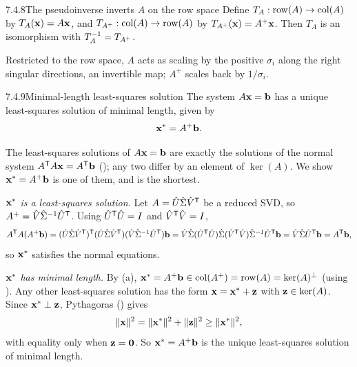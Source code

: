 \begin{thms}{7.4.8}{The pseudoinverse inverts $A$ on the row space}
Define $T_A:\operatorname{row}(A)\to\operatorname{col}(A)$ by $T_A(\mathbf{x})=A\mathbf{x}$, and $T_{A^+}:\operatorname{col}(A)\to\operatorname{row}(A)$ by $T_{A^+}(\mathbf{x})=A^+\mathbf{x}$. Then $T_A$ is an isomorphism with $T_A^{-1}=T_{A^+}$.
\end{thms}

\begin{proofomit}Restricted to the row space, $A$ acts as scaling by the positive $\sigma_i$ along the right singular directions, an invertible map; $A^+$ scales back by $1/\sigma_i$.
\end{proofomit}

\begin{thms}{7.4.9}{Minimal-length least-squares solution}
The system $A\mathbf{x}=\mathbf{b}$ has a unique least-squares solution of minimal length, given by
\[
\mathbf{x}^*=A^+\mathbf{b}.
\]
\end{thms}

\begin{prf}
The least-squares solutions of $A\mathbf{x}=\mathbf{b}$ are exactly the solutions of the normal system $A^{\mathsf{T}} A\mathbf{x}=A^{\mathsf{T}}\mathbf{b}$ (); any two differ by an element of $\ker(A)$. We show $\mathbf{x}^*=A^+\mathbf{b}$ is one of them, and is the shortest.

\emph{$\mathbf{x}^*$ is a least-squares solution.} Let $A=\hat U\hat\Sigma\hat V^{\mathsf{T}}$ be a reduced SVD, so $A^+=\hat V\hat\Sigma^{-1}\hat U^{\mathsf{T}}$. Using $\hat U^{\mathsf{T}}\hat U=I$ and $\hat V^{\mathsf{T}}\hat V=I$,
\[
A^{\mathsf{T}} A(A^+\mathbf{b})=(\hat U\hat\Sigma\hat V^{\mathsf{T}})^{\mathsf{T}}(\hat U\hat\Sigma\hat V^{\mathsf{T}})(\hat V\hat\Sigma^{-1}\hat U^{\mathsf{T}})\mathbf{b}
=\hat V\hat\Sigma(\hat U^{\mathsf{T}}\hat U)\hat\Sigma(\hat V^{\mathsf{T}}\hat V)\hat\Sigma^{-1}\hat U^{\mathsf{T}}\mathbf{b}
=\hat V\hat\Sigma\hat U^{\mathsf{T}}\mathbf{b}=A^{\mathsf{T}}\mathbf{b},
\]
so $\mathbf{x}^*$ satisfies the normal equations.

\emph{$\mathbf{x}^*$ has minimal length.} By (a), $\mathbf{x}^*=A^+\mathbf{b}\in\operatorname{col}(A^+)=\operatorname{row}(A)=\ker(A)^\perp$ (using ). Any other least-squares solution has the form $\mathbf{x}=\mathbf{x}^*+\mathbf{z}$ with $\mathbf{z}\in\ker(A)$. Since $\mathbf{x}^*\perp\mathbf{z}$, Pythagoras () gives
\[
\lVert \mathbf{x} \rVert^2=\lVert \mathbf{x}^* \rVert^2+\lVert \mathbf{z} \rVert^2\ge\lVert \mathbf{x}^* \rVert^2,
\]
with equality only when $\mathbf{z}=\mathbf{0}$. So $\mathbf{x}^*=A^+\mathbf{b}$ is the unique least-squares solution of minimal length.
\end{prf}

